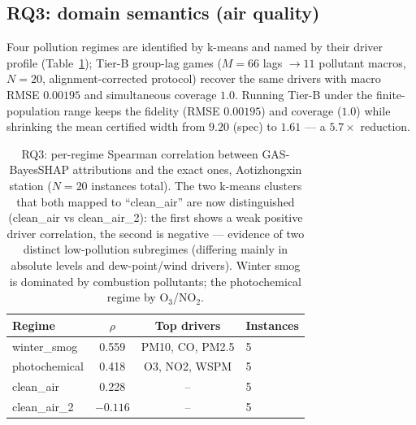 \documentclass[11pt,twocolumn]{article}
\begin{document}
\subsection{RQ3: domain semantics (air quality)}\label{sec:rq3}
Four pollution regimes are identified by k-means and named by their driver
profile (Table~\ref{rq3}); Tier-B group-lag games ($M=66$ lags $\to 11$
pollutant macros, $N=20$, alignment-corrected protocol) recover the same
drivers with macro RMSE $0.00195$ and simultaneous coverage $1.0$.
Running Tier-B under the finite-population range keeps the fidelity
(RMSE $0.00195$) and coverage ($1.0$) while shrinking the mean certified
width from $9.20$ (spec) to $1.61$ — a $5.7\times$ reduction.
\begin{table}[t]\centering\small
\begin{tabular}{lccl}
\toprule
Regime & $\rho$ & Top drivers & Instances \\
\midrule
winter\_smog & 0.559 & PM10, CO, PM2.5 & 5 \\
photochemical & 0.418 & O3, NO2, WSPM & 5 \\
clean\_air & 0.228 & -- & 5 \\
clean\_air\_2 & $-0.116$ & -- & 5 \\
\bottomrule
\end{tabular}
\caption{RQ3: per-regime Spearman correlation between GAS-BayesSHAP
attributions and the exact ones, Aotizhongxin station ($N=20$ instances
total).  The two k-means clusters that both mapped to ``clean\_air'' are
now distinguished (clean\_air vs clean\_air\_2): the first shows a weak
positive driver correlation, the second is negative — evidence of two
distinct low-pollution subregimes (differing mainly in absolute levels and
dew-point/wind drivers).  Winter smog is dominated by combustion
pollutants; the photochemical regime by O$_3$/NO$_2$.}
\label{rq3}
\end{table}
\end{document}
